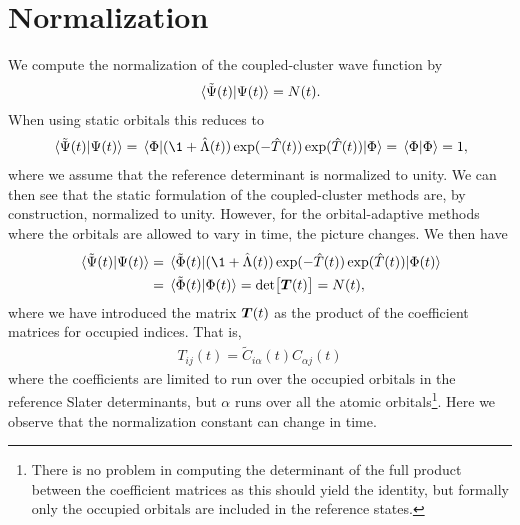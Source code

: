     \section{Normalization}
        We compute the normalization of the coupled-cluster wave function by
        \begin{align}
            \braket*{\tilde{\Psi}(t)}{\Psi(t)} = N(t).
        \end{align}
        When using static orbitals this reduces to
        \begin{align}
            \braket*{\tilde{\Psi}(t)}{\Psi(t)}
            = \mel*{\slat}{
                (\1 + \clustl(t))
                \exponential(-\clust(t))
                \exponential(\clust(t))
            }{\slat}
            = \braket*{\slat}{\slat}
            = 1,
        \end{align}
        where we assume that the reference determinant is normalized to
        unity.
        We can then see that the static formulation of the coupled-cluster
        methods are, by construction, normalized to unity.
        However, for the orbital-adaptive methods where the orbitals are
        allowed to vary in time, the picture changes.
        We then have
        \begin{align}
            \braket*{\tilde{\Psi}(t)}{\Psi(t)}
            &=
            \mel*{\tilde{\slat}(t)}{
                (\1 + \clustl(t))
                \exponential(-\clust(t))
                \exponential(\clust(t))
            }{\slat(t)}
            \\
            &= \braket*{\tilde{\slat}(t)}{\slat(t)}
            = \det[\vfg{T}(t)]
            = N(t),
            \label{eq:norm-oatdcc}
        \end{align}
        where we have introduced the matrix $\boldsymbol{T}(t)$ as the product of
        the coefficient matrices for occupied indices.
        That is,
        \begin{align}
            T_{ij}(t) = \tilde{C}_{i\alpha}(t) C_{\alpha j}(t)
        \end{align}
        where the coefficients are limited to run over the occupied orbitals
        in the reference Slater determinants, but $\alpha$ runs over all the
        atomic orbitals\footnote{%
            There is no problem in computing the determinant of the full
            product between the coefficient matrices as this should yield
            the identity, but formally only the occupied orbitals are
            included in the reference states.
        }.
        Here we observe that the normalization constant can change in time.
